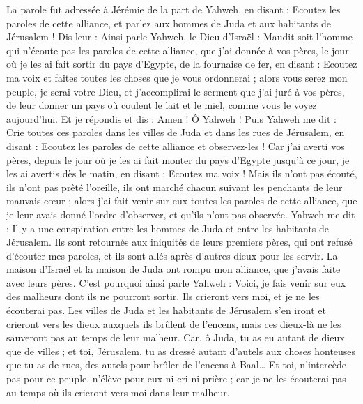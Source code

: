 \begin{multicols}{2}
\VerseOne{}La parole fut adressée à Jérémie de la part de Yahweh, en disant :
Ecoutez les paroles de cette alliance, et parlez aux hommes de Juda et aux habitants de Jérusalem !
Dis-leur : Ainsi parle Yahweh, le Dieu d'Israël : Maudit soit l'homme qui n'écoute pas les paroles de cette alliance,
que j'ai donnée à vos pères, le jour où je les ai fait sortir du pays d'Egypte, de la fournaise de fer, en disant : Ecoutez ma voix et faites toutes les choses que je vous ordonnerai ; alors vous serez mon peuple, je serai votre Dieu,
et j’accomplirai le serment que j'ai juré à vos pères, de leur donner un pays où coulent le lait et le miel, comme vous le voyez aujourd'hui. Et je répondis et dis : Amen ! Ô Yahweh !
Puis Yahweh me dit : Crie toutes ces paroles dans les villes de Juda et dans les rues de Jérusalem, en disant : Ecoutez les paroles de cette alliance et observez-les !
Car j'ai averti vos pères, depuis le jour où je les ai fait monter du pays d'Egypte jusqu’à ce jour, je les ai avertis dès le matin, en disant : Ecoutez ma voix !
Mais ils n'ont pas écouté, ils n'ont pas prêté l’oreille, ils ont marché chacun suivant les penchants de leur mauvais cœur ; alors j'ai fait venir sur eux toutes les paroles de cette alliance, que je leur avais donné l’ordre d’observer, et qu'ils n’ont pas observée.
Yahweh me dit : Il y a une conspiration entre les hommes de Juda et entre les habitants de Jérusalem.
Ils sont retournés aux iniquités de leurs premiers pères, qui ont refusé d'écouter mes paroles, et ils sont allés après d'autres dieux pour les servir. La maison d'Israël et la maison de Juda ont rompu mon alliance, que j'avais faite avec leurs pères.
C'est pourquoi ainsi parle Yahweh : Voici, je fais venir sur eux des malheurs dont ils ne pourront sortir. Ils crieront vers moi, et je ne les écouterai pas.
Les villes de Juda et les habitants de Jérusalem s'en iront et crieront vers les dieux auxquels ils brûlent de l’encens, mais ces dieux-là ne les sauveront pas au temps de leur malheur.
Car, ô Juda, tu as eu autant de dieux que de villes ; et toi, Jérusalem, tu as dressé autant d'autels aux choses honteuses que tu as de rues, des autels pour brûler de l’encens à Baal…
Et toi,  n’intercède pas pour ce peuple, n’élève pour eux ni cri ni prière ; car je ne les écouterai pas au temps où ils crieront vers moi dans leur malheur.

\end{multicols}
